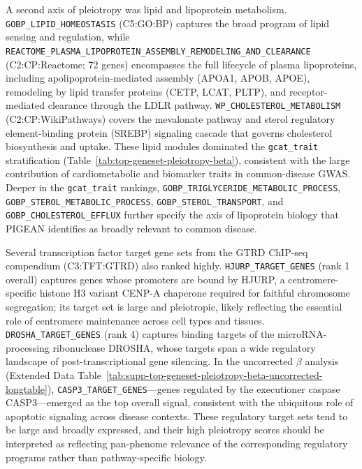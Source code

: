 A second axis of pleiotropy was lipid and lipoprotein metabolism. \texttt{GOBP\_LIPID\_HOMEOSTASIS} (C5:GO:BP) captures the broad program of lipid sensing and regulation, while \texttt{REACTOME\_PLASMA\_LIPOPROTEIN\_ASSEMBLY\_REMODELING\_AND\_CLEARANCE} (C2:CP:Reactome; 72 genes) encompasses the full lifecycle of plasma lipoproteins, including apolipoprotein-mediated assembly (APOA1, APOB, APOE), remodeling by lipid transfer proteins (CETP, LCAT, PLTP), and receptor-mediated clearance through the LDLR pathway. \texttt{WP\_CHOLESTEROL\_METABOLISM} (C2:CP:WikiPathways) covers the mevalonate pathway and sterol regulatory element-binding protein (SREBP) signaling cascade that governs cholesterol biosynthesis and uptake. These lipid modules dominated the \texttt{gcat\_trait} stratification (Table~\ref{tab:top-geneset-pleiotropy-beta}), consistent with the large contribution of cardiometabolic and biomarker traits in common-disease GWAS. Deeper in the \texttt{gcat\_trait} rankings, \texttt{GOBP\_TRIGLYCERIDE\_METABOLIC\_PROCESS}, \texttt{GOBP\_STEROL\_METABOLIC\_PROCESS}, \texttt{GOBP\_STEROL\_TRANSPORT}, and \texttt{GOBP\_CHOLESTEROL\_EFFLUX} further specify the axis of lipoprotein biology that PIGEAN identifies as broadly relevant to common disease.


Several transcription factor target gene sets from the GTRD ChIP-seq compendium (C3:TFT:GTRD\cite{yevshin_gtrd_2019}) also ranked highly. \texttt{HJURP\_TARGET\_GENES} (rank 1 overall) captures genes whose promoters are bound by HJURP, a centromere-specific histone H3 variant CENP-A chaperone required for faithful chromosome segregation\cite{dunleavy_hjurp_2009}; its target set is large and pleiotropic, likely reflecting the essential role of centromere maintenance across cell types and tissues. \texttt{DROSHA\_TARGET\_GENES} (rank 4) captures binding targets of the microRNA-processing ribonuclease DROSHA, whose targets span a wide regulatory landscape of post-transcriptional gene silencing\cite{lee_drosha_2003}. In the uncorrected $\beta$ analysis (Extended Data Table~\ref{tab:supp-top-geneset-pleiotropy-beta-uncorrected-longtable}), \texttt{CASP3\_TARGET\_GENES}---genes regulated by the executioner caspase CASP3---emerged as the top overall signal, consistent with the ubiquitous role of apoptotic signaling across disease contexts. These regulatory target sets tend to be large and broadly expressed, and their high pleiotropy scores should be interpreted as reflecting pan-phenome relevance of the corresponding regulatory programs rather than pathway-specific biology.

